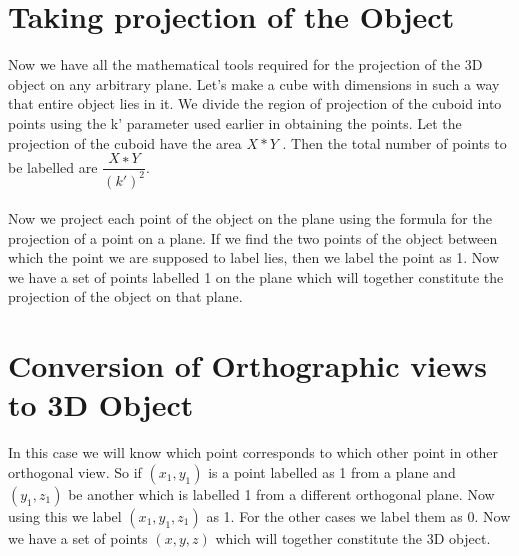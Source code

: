 \documentclass[18pt]{article}
\begin{document}
{\section{Taking projection of the Object}
\large{Now we have all the mathematical tools required for the projection of the 3D object on any arbitrary plane. Let’s make a cube with dimensions in such a way that entire object lies in it. We divide the region of projection of the cuboid into points using the k’ parameter used earlier in obtaining the points. Let the projection of the cuboid have the area $X* Y $ . Then the total number of points to be labelled are $\dfrac{X∗ Y }{(k′)^2}.  $\\{}\\
Now we project each point of the object on the plane using the formula for the projection of a point on a plane. If we find the two points of the object  between which the point we are supposed to label lies, then we label the point as 1. Now we have a set of points labelled 1 on the plane which will together constitute the projection of the object on that plane.}
\section{Conversion of Orthographic views to 3D Object}
\large{In this case we will know which point corresponds to which other point in other orthogonal view. So if $(x_{1},y_{1})$ is a point labelled as 1 from a plane and $(y_{1},z_{1})$ be another which is labelled 1 from a different orthogonal plane. Now using this we label $(x_{1},y_{1},z_{1})$ as 1. For the other cases we label them as 0. Now we have a set of points $(x,y,z)$ which will together constitute the 3D object. }
}
\end{document}
